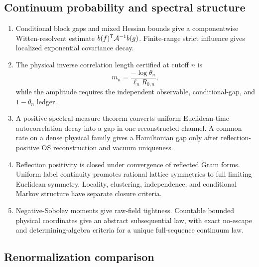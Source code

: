 \documentclass[11pt]{article}
\theoremstyle{remark}
\begin{document}
\subsection{Continuum probability and spectral structure}

\begin{enumerate}[leftmargin=2.2em]
\item Conditional block gaps and mixed Hessian bounds give a
      componentwise Witten-resolvent estimate
      \(b(f)^{\mathsf T}{\cal A}^{-1}b(g)\).  Finite-range strict
      influence gives localized exponential covariance decay.
\item The physical inverse correlation length certified at cutoff
      \(n\) is
      \[
      m_n=\frac{-\log\theta_n}{\ell_nR_{0,n}},       \tag{1.3}
      \]
      while the amplitude requires the independent observable,
      conditional-gap, and \(1-\theta_n\) ledger.
\item A positive spectral-measure theorem converts uniform
      Euclidean-time autocorrelation decay into a gap in one
      reconstructed channel.  A common rate on a dense physical
      family gives a Hamiltonian gap only after reflection-positive
      OS reconstruction and vacuum uniqueness.
\item Reflection positivity is closed under convergence of reflected
      Gram forms.  Uniform label continuity promotes rational
      lattice symmetries to full limiting Euclidean symmetry.
      Locality, clustering, independence, and conditional Markov
      structure have separate closure criteria.
\item Negative-Sobolev moments give raw-field tightness.  Countable
      bounded physical coordinates give an abstract subsequential
      law, with exact no-escape and determining-algebra criteria for
      a unique full-sequence continuum law.
\end{enumerate}

\subsection{Renormalization comparison}
\end{document}
